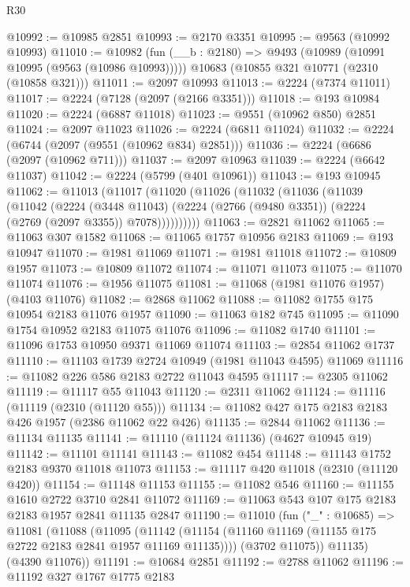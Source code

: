 \begin{lexlean}{R30}
\begin{coremodule}
@10992 := @10985 @2851
@10993 := @2170 @3351
@10995 := @9563 (@10992 @10993)
@11010 := @10982
    (fun (__b : @2180) => @9493 (@10989 (@10991 @10995 (@9563 (@10986 @10993)))))
    @10683
    (@10855 @321 @10771 (@2310 (@10858 @321)))
@11011 := @2097 @10993
@11013 := @2224 (@7374 @11011)
@11017 := @2224 (@7128 (@2097 (@2166 @3351)))
@11018 := @193 @10984
@11020 := @2224 (@6887 @11018)
@11023 := @9551 (@10962 @850) @2851
@11024 := @2097 @11023
@11026 := @2224 (@6811 @11024)
@11032 := @2224 (@6744 (@2097 (@9551 (@10962 @834) @2851)))
@11036 := @2224 (@6686 (@2097 (@10962 @711)))
@11037 := @2097 @10963
@11039 := @2224 (@6642 @11037)
@11042 := @2224 (@5799 (@401 @10961))
@11043 := @193 @10945
@11062 := @11013
    (@11017
      (@11020
        (@11026
          (@11032
            (@11036
              (@11039
                (@11042
                  (@2224
                    (@3448 @11043)
                    (@2224 (@2766 (@9480 @3351)) (@2224 (@2769 (@2097 @3355)) @7078))))))))))
@11063 := @2821 @11062
@11065 := @11063 @307 @1582
@11068 := @11065 @1757 @10956 @2183
@11069 := @193 @10947
@11070 := @1981 @11069
@11071 := @1981 @11018
@11072 := @10809 @1957
@11073 := @10809 @11072
@11074 := @11071 @11073
@11075 := @11070 @11074
@11076 := @1956 @11075
@11081 := @11068 (@1981 @11076 @1957) (@4103 @11076)
@11082 := @2868 @11062
@11088 := @11082 @1755 @175 @10954 @2183 @11076 @1957
@11090 := @11063 @182 @745
@11095 := @11090 @1754 @10952 @2183 @11075 @11076
@11096 := @11082 @1740
@11101 := @11096 @1753 @10950 @9371 @11069 @11074
@11103 := @2854 @11062 @1737
@11110 := @11103 @1739 @2724 @10949 (@1981 @11043 @4595) @11069
@11116 := @11082 @226 @586 @2183 @2722 @11043 @4595
@11117 := @2305 @11062
@11119 := @11117 @55 @11043
@11120 := @2311 @11062
@11124 := @11116 (@11119 (@2310 (@11120 @55)))
@11134 := @11082 @427 @175 @2183 @2183 @426 @1957 (@2386 @11062 @22 @426)
@11135 := @2844 @11062
@11136 := @11134 @11135
@11141 := @11110 (@11124 @11136) (@4627 @10945 @19)
@11142 := @11101 @11141
@11143 := @11082 @454
@11148 := @11143 @1752 @2183 @9370 @11018 @11073
@11153 := @11117 @420 @11018 (@2310 (@11120 @420))
@11154 := @11148 @11153
@11155 := @11082 @546
@11160 := @11155 @1610 @2722 @3710 @2841 @11072
@11169 := @11063 @543 @107 @175 @2183 @2183 @1957 @2841 @11135 @2847
@11190 := @11010
    (fun ("_" : @10685) =>
    @11081
      (@11088
        (@11095
          (@11142 (@11154 (@11160 @11169 (@11155 @175 @2722 @2183 @2841 @1957 @11169 @11135))))
          (@3702 @11075))
        @11135)
      (@4390 @11076))
@11191 := @10684 @2851
@11192 := @2788 @11062
@11196 := @11192 @327 @1767 @1775 @2183

\end{coremodule}
\end{lexlean}
